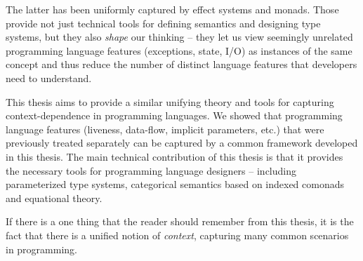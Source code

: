 The latter has been uniformly captured by effect systems and monads. Those provide not just 
technical tools for defining semantics and designing type systems, but they also \emph{shape}
our thinking -- they let us view seemingly unrelated programming language features (exceptions,
state, I/O) as instances of the same concept and thus reduce the number of distinct language
features that developers need to understand. 

This thesis aims to provide a similar unifying theory and tools for capturing context-dependence
in programming languages. We showed that programming language features (liveness, data-flow, 
implicit parameters, etc.) that were previously treated separately can be captured by a common 
framework developed in this thesis. The main technical contribution of this thesis is that it  
provides the necessary tools for programming language designers -- including parameterized type 
systems, categorical semantics based on indexed comonads and equational theory.

If there is a one thing that the reader should remember from this thesis, it is the fact that
there is a unified notion of \emph{context}, capturing many common scenarios in programming.
